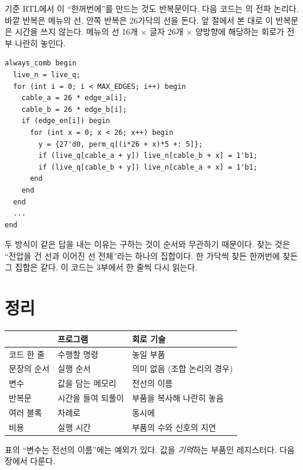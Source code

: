 기준 RTL에서 이 ``한꺼번에''를 만드는 것도 반복문이다. 다음 코드는 의 전파 논리다.
바깥 반복은 메뉴의 선, 안쪽 반복은 26가닥의 선을 돈다. 앞 절에서 본 대로 이 반복문은 시간을 쓰지 않는다.
메뉴의 선 16개 × 글자 26개 × 양방향에 해당하는 회로가 전부 나란히 놓인다.

\begin{lstlisting}[language=SV,caption={\code{rtl/src/bombe\_core.sv}의 전파 논리(일부).},label={lst:g-spread}]
always_comb begin
  live_n = live_q;
  for (int i = 0; i < MAX_EDGES; i++) begin
    cable_a = 26 * edge_a[i];
    cable_b = 26 * edge_b[i];
    if (edge_en[i]) begin
      for (int x = 0; x < 26; x++) begin
        y = {27'd0, perm_q[(i*26 + x)*5 +: 5]};
        if (live_q[cable_a + y]) live_n[cable_b + x] = 1'b1;
        if (live_q[cable_b + y]) live_n[cable_a + x] = 1'b1;
      end
    end
  end
  ...
end
\end{lstlisting}

두 방식이 같은 답을 내는 이유는 구하는 것이 순서와 무관하기 때문이다. 찾는 것은 ``전압을 건 선과 이어진
선 전체''라는 하나의 집합이다. 한 가닥씩 찾든 한꺼번에 찾든 그 집합은 같다. 이 코드는 3부에서 한 줄씩
다시 읽는다.

\section{정리}

\begin{center}
\small
\begin{tabular}{lll}
\toprule
 & 프로그램 & 회로 기술 \\
\midrule
코드 한 줄 & 수행할 명령 & 놓일 부품 \\
문장의 순서 & 실행 순서 & 의미 없음 (조합 논리의 경우) \\
변수 & 값을 담는 메모리 & 전선의 이름 \\
반복문 & 시간을 들여 되풀이 & 부품을 복사해 나란히 놓음 \\
여러 블록 & 차례로 & 동시에 \\
비용 & 실행 시간 & 부품의 수와 신호의 지연 \\
\bottomrule
\end{tabular}
\end{center}

표의 ``변수는 전선의 이름''에는 예외가 있다. 값을 \emph{기억}하는 부품인 레지스터다. 다음 장에서 다룬다.
